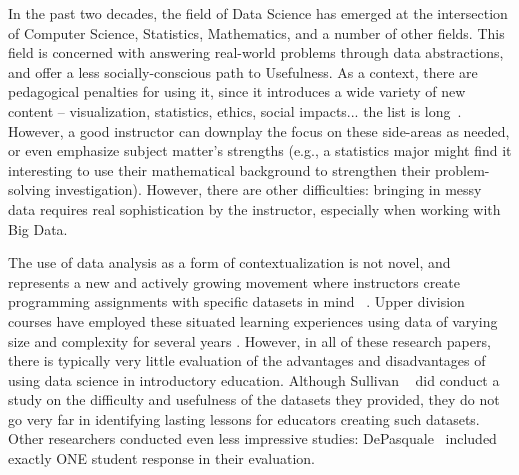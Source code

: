 In the past two decades, the field of Data Science has emerged at the intersection of Computer Science, Statistics, Mathematics, and a number of other fields.
This field is concerned with answering real-world problems through data abstractions, and offer a less socially-conscious path to Usefulness.
As a context, there are pedagogical penalties for using it, since it introduces a wide variety of new content -- visualization, statistics, ethics, social impacts... the list is long~\cite{Anderson:2015-DP2}.
However, a good instructor can downplay the focus on these side-areas as needed, or even emphasize subject matter's strengths (e.g., a statistics major might find it interesting to use their mathematical background to strengthen their problem-solving investigation).
However, there are other difficulties: bringing in messy data requires real sophistication by the instructor, especially when working with Big Data.

The use of data analysis as a form of contextualization is not novel, and represents a new and actively growing movement where instructors create programming assignments with specific datasets in mind ~\cite{Anderson, Sullivan:2013, Hall-Holt:2015, DePasquale:2006}.
Upper division courses have employed these situated learning experiences using data of varying size and complexity for several years \cite{Egger, datamining, Waldman}.
However, in all of these research papers, there is typically very little evaluation of the advantages and disadvantages of using data science in introductory education.
Although Sullivan ~\cite{Sullivan:2013} did conduct a study on the difficulty and usefulness of the datasets they provided, they do not go very far in identifying lasting lessons for educators creating such datasets.
Other researchers conducted even less impressive studies: DePasquale~\cite{DePasquale:2006} included exactly ONE student response in their evaluation.
